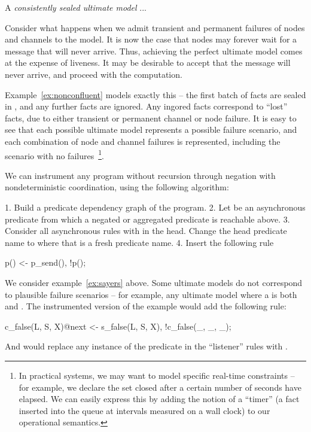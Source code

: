 \begin{definition}
A {\em consistently sealed ultimate model} ...
\end{definition}


Consider what happens when we admit transient and permanent failures of nodes and channels to the model.  It is now the case that nodes may forever wait for a message that will never arrive.  Thus, achieving the perfect ultimate model comes at the expense of liveness.  It may be desirable to accept that the message will never arrive, and proceed with the computation.

Example~\ref{ex:nonconfluent} models exactly this -- the first batch of  facts are sealed in , and any further  facts are ignored.  Any ingored  facts correspond to ``lost''  facts, due to either transient or permanent channel or node failure.  It is easy to see that each possible ultimate model represents a possible failure scenario, and each combination of node and channel failures is represented, including the scenario with no failures~\footnote{In practical systems, we may want to model specific real-time constraints -- for example, we declare the set closed after a certain number of seconds have elapsed.  We can easily express this by adding the notion of a ``timer'' (a fact inserted into the queue at intervals measured on a wall clock) to our operational semantics.}.

We can instrument any \lang program without recursion through negation with nondeterministic coordination, using the following algorithm:

1. Build a predicate dependency graph of the program.
2. Let  be an asynchronous predicate from which a negated or aggregated predicate is reachable above.
3. Consider all asynchronous rules with  in the head.  Change the head predicate name to  where that is a fresh predicate name.
4. Insert the following rule
\begin{Dedalus}
p() <- p_send(), !p(\dbar{_});
\end{Dedalus}

We consider example~\ref{ex:sayers} above.  Some ultimate models do not correspond to plausible failure scenarios -- for example, any ultimate model where a  is both  and .  The instrumented version of the example would add the following rule:

\begin{Dedalus}
c_false(L, S, X)@next <- s_false(L, S, X),
                         !c_false(_, _, _);
\end{Dedalus}

And would replace any instance of the predicate  in the ``listener'' rules with .
